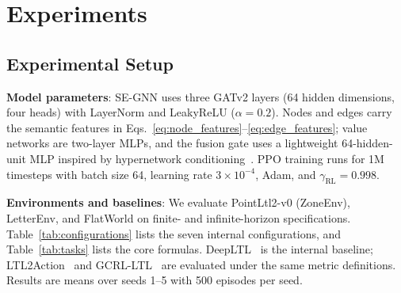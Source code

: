 \documentclass[conference]{IEEEtran}
\begin{document}
\section{Experiments}
\label{sec:experiments}

\subsection{Experimental Setup}

	\textbf{Model parameters}: SE-GNN uses three GATv2 layers (64 hidden dimensions, four heads) with LayerNorm and LeakyReLU ($\alpha=0.2$). Nodes and edges carry the semantic features in Eqs.~\ref{eq:node_features}--\ref{eq:edge_features}; value networks are two-layer MLPs, and the fusion gate uses a lightweight 64-hidden-unit MLP inspired by hypernetwork conditioning~\citep{klocek2019hypernetwork}. PPO training runs for 1M timesteps with batch size 64, learning rate $3\times10^{-4}$, Adam, and $\gamma_{\text{RL}}=0.998$.

	\textbf{Environments and baselines}: We evaluate PointLtl2-v0 (ZoneEnv), LetterEnv, and FlatWorld on finite- and infinite-horizon specifications. Table~\ref{tab:configurations} lists the seven internal configurations, and Table~\ref{tab:tasks} lists the core formulas. DeepLTL~\citep{deepltl} is the internal baseline; LTL2Action~\citep{Vaezipoor2021} and GCRL-LTL~\citep{Jothimurugan2021} are evaluated under the same metric definitions. Results are means over seeds 1--5 with 500 episodes per seed.

\begin{table}[htbp]
\centering
\caption{Task Evaluation Set}
\label{tab:tasks}
\end{table}
\end{document}
